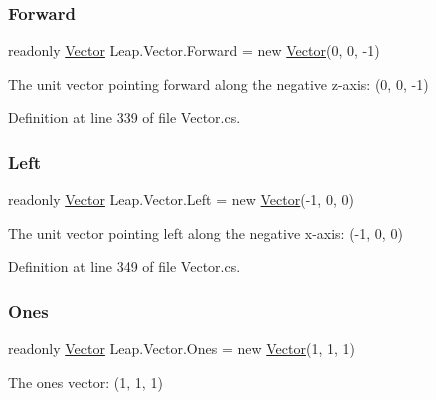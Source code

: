 \subsubsection{\texorpdfstring{Forward}{Forward}}
{\footnotesize\ttfamily readonly \mbox{\hyperlink{struct_leap_1_1_vector}{Vector}} Leap.\+Vector.\+Forward = new \mbox{\hyperlink{struct_leap_1_1_vector}{Vector}}(0, 0, -\/1)\hspace{0.3cm}{\ttfamily [static]}}



The unit vector pointing forward along the negative z-\/axis\+: (0, 0, -\/1) 



Definition at line 339 of file Vector.\+cs.

\mbox{\label{struct_leap_1_1_vector_a62b9bbd54a4b89f695a106f42fcff881}} 
\subsubsection{\texorpdfstring{Left}{Left}}
{\footnotesize\ttfamily readonly \mbox{\hyperlink{struct_leap_1_1_vector}{Vector}} Leap.\+Vector.\+Left = new \mbox{\hyperlink{struct_leap_1_1_vector}{Vector}}(-\/1, 0, 0)\hspace{0.3cm}{\ttfamily [static]}}



The unit vector pointing left along the negative x-\/axis\+: (-\/1, 0, 0) 



Definition at line 349 of file Vector.\+cs.

\mbox{\label{struct_leap_1_1_vector_a0eb4303bb2650290ac5ca18f1e59563d}} 
\subsubsection{\texorpdfstring{Ones}{Ones}}
{\footnotesize\ttfamily readonly \mbox{\hyperlink{struct_leap_1_1_vector}{Vector}} Leap.\+Vector.\+Ones = new \mbox{\hyperlink{struct_leap_1_1_vector}{Vector}}(1, 1, 1)\hspace{0.3cm}{\ttfamily [static]}}



The ones vector\+: (1, 1, 1) 



